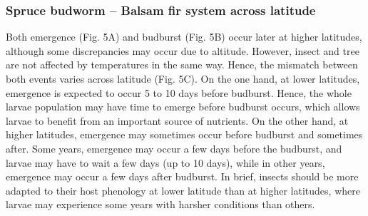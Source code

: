 \documentclass[12 pt]{article}
\begin{document}
\subsubsection{Spruce budworm – Balsam fir system across latitude}
Both emergence (Fig. 5A) and budburst (Fig. 5B) occur later at higher latitudes, although some discrepancies may occur due to altitude. However, insect and tree are not affected by temperatures in the same way. Hence, the mismatch between both events varies across latitude (Fig. 5C). On the one hand, at lower latitudes, emergence is expected to occur 5 to 10 days before budburst. Hence, the whole larvae population may have time to emerge before budburst occurs, which allows larvae to benefit from an important source of nutrients. On the other hand, at higher latitudes, emergence may sometimes occur before budburst and sometimes after. Some years, emergence may occur a few days before the budburst, and larvae may have to wait a few days (up to 10 days), while in other years, emergence may occur a few days after budburst. In brief, insects should be more adapted to their host phenology at lower latitude than at higher latitudes, where larvae may experience some years with harsher conditions than others.
\end{document}
